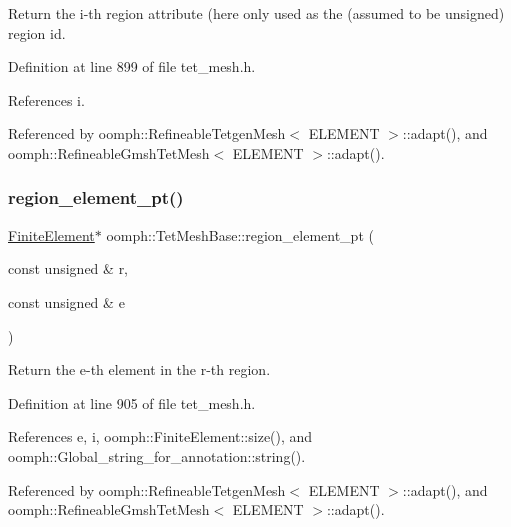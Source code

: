 Return the i-\/th region attribute (here only used as the (assumed to be unsigned) region id. 



Definition at line 899 of file tet\+\_\+mesh.\+h.



References i.



Referenced by oomph\+::\+Refineable\+Tetgen\+Mesh$<$ E\+L\+E\+M\+E\+N\+T $>$\+::adapt(), and oomph\+::\+Refineable\+Gmsh\+Tet\+Mesh$<$ E\+L\+E\+M\+E\+N\+T $>$\+::adapt().

\mbox{\label{classoomph_1_1TetMeshBase_aad68c706b9ff575128cc995f51d31b00}} 
\subsubsection{\texorpdfstring{region\+\_\+element\+\_\+pt()}{region\_element\_pt()}}
{\footnotesize\ttfamily \hyperlink{classoomph_1_1FiniteElement}{Finite\+Element}$\ast$ oomph\+::\+Tet\+Mesh\+Base\+::region\+\_\+element\+\_\+pt (\begin{DoxyParamCaption}\item[{const unsigned \&}]{r,  }\item[{const unsigned \&}]{e }\end{DoxyParamCaption})\hspace{0.3cm}{\ttfamily [inline]}}



Return the e-\/th element in the r-\/th region. 



Definition at line 905 of file tet\+\_\+mesh.\+h.



References e, i, oomph\+::\+Finite\+Element\+::size(), and oomph\+::\+Global\+\_\+string\+\_\+for\+\_\+annotation\+::string().



Referenced by oomph\+::\+Refineable\+Tetgen\+Mesh$<$ E\+L\+E\+M\+E\+N\+T $>$\+::adapt(), and oomph\+::\+Refineable\+Gmsh\+Tet\+Mesh$<$ E\+L\+E\+M\+E\+N\+T $>$\+::adapt().

\mbox{\label{classoomph_1_1TetMeshBase_a7a1c53094acf2416a17867cc3b126cfe}} 
